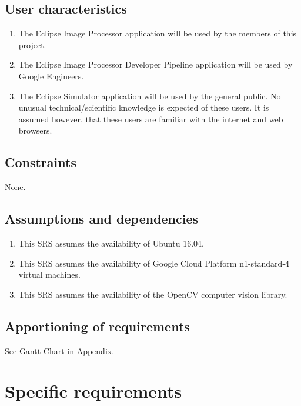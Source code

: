 \documentclass[10pt, onecolumn, draftclsnofoot, letterpaper, compsoc]{IEEEtran}
\begin{document}
\subsection{User characteristics}
	\begin{enumerate}
		\item The Eclipse Image Processor application will be used by
            the members of this project.

		\item The Eclipse Image Processor Developer Pipeline application will be
            used by Google Engineers.

		\item The Eclipse Simulator application will be used by the
			general public. No unusual technical/scientific knowledge is
			expected of these users. It is assumed however, that these users
			are familiar with the internet and web browsers.
	\end{enumerate}

\subsection{Constraints}
None.

\subsection{Assumptions and dependencies}
	\begin{enumerate}
		\item This SRS assumes the availability of Ubuntu 16.04.

		\item This SRS assumes the availability of Google Cloud Platform
		n1-standard-4 virtual machines.

		\item This SRS assumes the availability of the OpenCV computer
		vision library.
	\end{enumerate}

\subsection{Apportioning of requirements}
See Gantt Chart in Appendix.

\newpage
\section{Specific requirements}
\end{document}
